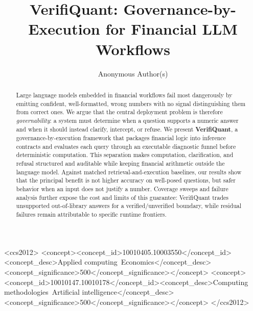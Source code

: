 \documentclass[sigconf,anonymous]{acmart}
\begin{document}
\title{VerifiQuant: Governance-by-Execution for Financial LLM Workflows}

\author{Anonymous Author(s)}

\begin{abstract}
Large language models embedded in financial workflows fail most dangerously by emitting confident, well-formatted, wrong numbers with no signal distinguishing them from correct ones.
We argue that the central deployment problem is therefore \emph{governability}: a system must determine when a question supports a numeric answer and when it should instead clarify, intercept, or refuse.
We present \textbf{VerifiQuant}, a governance-by-execution framework that packages financial logic into inference contracts and evaluates each query through an executable diagnostic funnel before deterministic computation.
This separation makes computation, clarification, and refusal structured and auditable while keeping financial arithmetic outside the language model.
Against matched retrieval-and-execution baselines, our results show that the principal benefit is not higher accuracy on well-posed questions, but safer behavior when an input does not justify a number.
Coverage sweeps and failure analysis further expose the cost and limits of this guarantee: VerifiQuant trades unsupported out-of-library answers for a verified/unverified boundary, while residual failures remain attributable to specific runtime frontiers.
\end{abstract}

\begin{CCSXML}
<ccs2012>
<concept><concept_id>10010405.10003550</concept_id><concept_desc>Applied computing~Economics</concept_desc><concept_significance>500</concept_significance></concept>
<concept><concept_id>10010147.10010178</concept_id><concept_desc>Computing methodologies~Artificial intelligence</concept_desc><concept_significance>500</concept_significance></concept>
</ccs2012>
\end{CCSXML}

\maketitle

\setlength{\abovedisplayskip}{5pt plus 2pt minus 2pt}
\setlength{\belowdisplayskip}{5pt plus 2pt minus 2pt}
\setlength{\abovedisplayshortskip}{2pt plus 2pt}
\setlength{\belowdisplayshortskip}{4pt plus 2pt minus 2pt}
\end{document}
